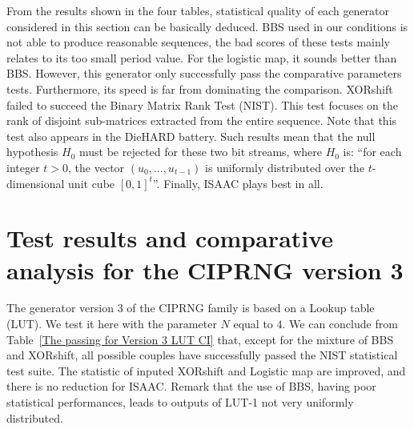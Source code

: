 From the results shown in the four tables, statistical quality of each generator 
considered in this section can be basically deduced. 
BBS used in our conditions is not able to
produce reasonable sequences, the bad scores of these tests mainly relates to its too small period value. 
For the logistic map, it sounds better than BBS. However, this generator only successfully pass the comparative parameters tests.
Furthermore, its speed is far from dominating the comparison. 
XORshift failed to succeed the Binary Matrix Rank Test (NIST). 
This test focuses on the rank of disjoint 
sub-matrices extracted from the entire sequence. 
Note that this 
test also appears in the DieHARD battery.  
Such results mean that the 
null hypothesis $H_0$ must be rejected for these two bit streams, where $H_0$ is: ``for each integer $t>0$, the vector $(u_0 , ..., u_{t-1})$ is uniformly 
distributed over the $t$-dimensional unit cube $[0, 1]^t$''.
Finally, ISAAC plays best in all.

\section{Test results and comparative analysis for the CIPRNG version 3}
\label{Results of NISTfor Version 3 CI}
 
The generator version 3 
of the CIPRNG family is based on a 
Lookup table (LUT).
We test it here with the parameter $N$
equal to $4$.
We can conclude from Table~\ref{The passing for Version 3 LUT CI} that, except for the mixture of BBS and XORshift, all 
possible couples have successfully passed the NIST statistical test suite. The statistic of inputed XORshift and Logistic map are improved, and there is no reduction for ISAAC.
Remark that the use of BBS, having poor statistical performances, leads to outputs of LUT-1 not very uniformly distributed. 


